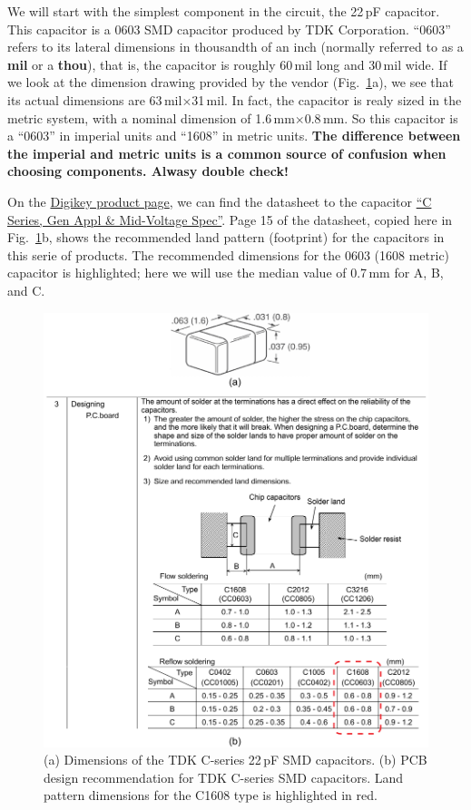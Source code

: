\documentclass[12pt,letterpaper]{scrartcl}
\begin{document}
We will start with the simplest component in the circuit, the 22\,pF capacitor. This capacitor is a 0603 SMD capacitor produced by TDK Corporation. ``0603'' refers to its lateral dimensions in thousandth of an inch (normally referred to as a \textbf{mil} or a \textbf{thou}), that is, the capacitor is roughly 60\,mil long and 30\,mil wide. If we look at the dimension drawing provided by the vendor (Fig.~\ref{fig:tdk_cap_datasheet}a), we see that its actual dimensions are 63\,mil$\times$31\,mil. In fact, the capacitor is realy sized in the metric system, with a nominal dimension of 1.6\,mm$\times$0.8\,mm. So this capacitor is a ``0603'' in imperial units and ``1608'' in metric units. \textbf{The difference between the imperial and metric units is a common source of confusion when choosing components. Alwasy double check!}

On the \href{http://www.digikey.com/product-detail/en/C1608C0G1H220J080AA/445-1273-1-ND/567670}{Digikey product page}, we can find the datasheet to the capacitor \href{http://product.tdk.com/en/catalog/spec/mlccspec_commercial_general_midvoltage_en.pdf}{``C Series, Gen Appl \& Mid-Voltage Spec''}. Page 15 of the datasheet, copied here in Fig.~\ref{fig:tdk_cap_datasheet}b, shows the recommended land pattern (footprint) for the capacitors in this serie of products. The recommended dimensions for the 0603 (1608 metric) capacitor is highlighted; here we will use the median value of 0.7\,mm for A, B, and C. 

	\begin{figure}[hp]
		\centering
		\includegraphics{tdk_cap_datasheet}
		\caption{(a) Dimensions of the TDK C-series 22\,pF SMD capacitors. (b) PCB design recommendation for TDK C-series SMD capacitors. Land pattern dimensions for the C1608 type is highlighted in red.}
		\label{fig:tdk_cap_datasheet}
	\end{figure}
\end{document}
